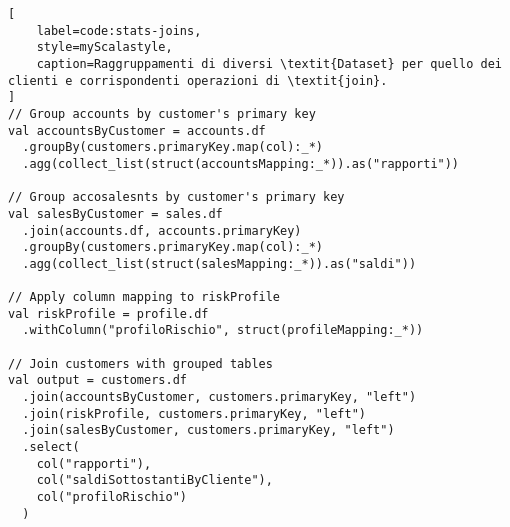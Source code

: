 \begin{lstlisting}[
    label=code:stats-joins,
    style=myScalastyle,
    caption=Raggruppamenti di diversi \textit{Dataset} per quello dei clienti e corrispondenti operazioni di \textit{join}.
]
// Group accounts by customer's primary key
val accountsByCustomer = accounts.df
  .groupBy(customers.primaryKey.map(col):_*)
  .agg(collect_list(struct(accountsMapping:_*)).as("rapporti"))

// Group accosalesnts by customer's primary key
val salesByCustomer = sales.df
  .join(accounts.df, accounts.primaryKey)
  .groupBy(customers.primaryKey.map(col):_*)
  .agg(collect_list(struct(salesMapping:_*)).as("saldi"))

// Apply column mapping to riskProfile
val riskProfile = profile.df
  .withColumn("profiloRischio", struct(profileMapping:_*))

// Join customers with grouped tables
val output = customers.df
  .join(accountsByCustomer, customers.primaryKey, "left")
  .join(riskProfile, customers.primaryKey, "left")
  .join(salesByCustomer, customers.primaryKey, "left")
  .select(
    col("rapporti"),
    col("saldiSottostantiByCliente"),
    col("profiloRischio")
  )
\end{lstlisting}